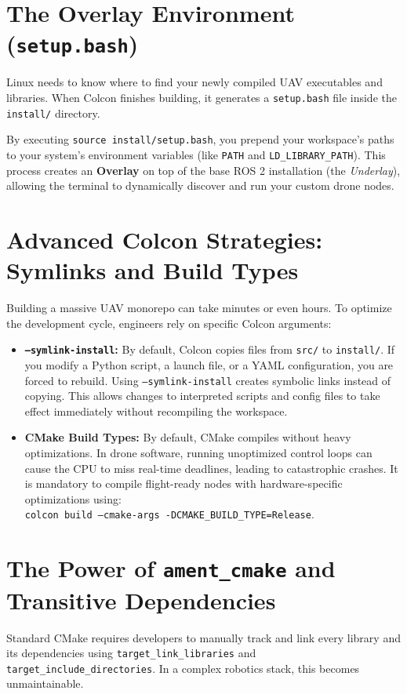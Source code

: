 \documentclass{article}
\begin{document}
\section{The Overlay Environment (\texttt{setup.bash})}
Linux needs to know where to find your newly compiled UAV executables and libraries. 
When Colcon finishes building, it generates a \texttt{setup.bash} file inside the \texttt{install/} directory. 

By executing \texttt{source install/setup.bash}, you prepend your workspace's paths to your system's environment variables (like \texttt{PATH} and 
\texttt{LD\_LIBRARY\_PATH}). This process creates an \textbf{Overlay} on top of the base ROS 2 installation (the \textit{Underlay}), allowing the terminal 
to dynamically discover and run your custom drone nodes.

\section{Advanced Colcon Strategies: Symlinks and Build Types}
Building a massive UAV monorepo can take minutes or even hours. To optimize the development cycle, engineers rely on specific Colcon arguments:
\begin{itemize}
    \item \textbf{\texttt{--symlink-install}:} By default, Colcon copies files from \texttt{src/} to \texttt{install/}. 
    If you modify a Python script, a launch file, or a YAML configuration, you are forced to rebuild. Using \texttt{--symlink-install} creates symbolic links 
    instead of copying. This allows changes to interpreted scripts and config files to take effect immediately without recompiling the workspace.
    \item \textbf{CMake Build Types:} By default, CMake compiles without heavy optimizations. In drone software, running unoptimized control loops can cause 
    the CPU to miss real-time deadlines, leading to catastrophic crashes. It is mandatory to compile flight-ready nodes with hardware-specific 
    optimizations using: \\
    \texttt{colcon build --cmake-args -DCMAKE\_BUILD\_TYPE=Release}.
\end{itemize}

\section{The Power of \texttt{ament\_cmake} and Transitive Dependencies}
Standard CMake requires developers to manually track and link every library and its dependencies 
using \texttt{target\_link\_libraries} and \texttt{target\_include\_directories}. In a complex robotics stack, this becomes unmaintainable.
\end{document}
